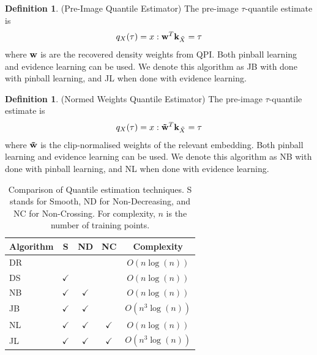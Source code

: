 \documentclass[twoside]{article} \usepackage{aistats2017}
\theoremstyle{definition}
\newtheorem{definition}[theorem]{Definition}
\newcommand{\rv}[1]{{#1}}
\newcommand{\ds}[1]{\tilde{#1}}
\begin{document}
	\theoremstyle{definition}
	\begin{definition}
		(Pre-Image Quantile Estimator)
		The pre-image $\tau$-quantile estimate is
		\begin{equation}
			q_{\rv{X}}(\tau) = x : \bvec{w}^{T} \bvec{k}_{\ds{X}} = \tau
		\end{equation}	
		where $\mathbf{w}$ is are the recovered density weights from QPI.
		Both pinball learning and evidence learning can be used. We denote this algorithm as JB with done with pinball learning, and JL when done with evidence learning.
	\end{definition}
	
	\theoremstyle{definition}
	\begin{definition}
		(Normed Weights Quantile Estimator)
		The pre-image $\tau$-quantile estimate is
		\begin{equation}
		q_{\rv{X}}(\tau) = x : \bvec{\tilde{w}}^{T} \bvec{k}_{\ds{X}} = \tau
		\end{equation}
		where $\mathbf{\tilde{w}}$ is the clip-normalised weights of the relevant embedding.
		Both pinball learning and evidence learning can be used. We denote this algorithm as NB with done with pinball learning, and NL when done with evidence learning.
	\end{definition}	
	
	\begin{table}[t!]
		\begin{center}
			\begin{tabular}{l|cccc}
				Algorithm & S & ND &   NC & Complexity \\ \hline
				DR  &              &                &                & $O(n \log(n))$    \\
				DS  & $\checkmark$ &                &                &
				$O(n \log(n))$  \\
				NB  & $\checkmark$ & $\checkmark$   &                &
				$O(n \log(n))$ \\
				JB  & $\checkmark$ & $\checkmark$   &                &
				$O(n^{3} \log(n))$ \\
				NL  & $\checkmark$ & $\checkmark$   & $\checkmark$   &
				$O(n \log(n))$ \\
				JL  & $\checkmark$ & $\checkmark$   & $\checkmark$   &   $O(n^{3} \log(n))$ 
			\end{tabular}
		\end{center}
		\caption{Comparison of Quantile estimation techniques. S stands for Smooth, ND for Non-Decreasing, and NC for Non-Crossing. For complexity, $n$ is the number of training points.}
		\label{table:quantile_regression_methods}
	\end{table}
	
\end{document}
